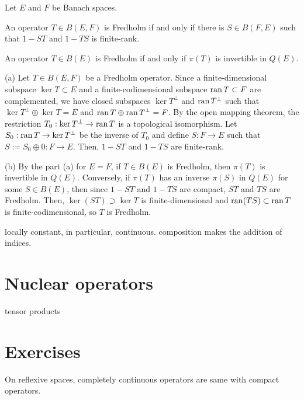 \documentclass{../../large}
\begin{document}
\begin{prb}
Let $E$ and $F$ be Banach spaces.
\begin{parts}
\item An operator $T\in B(E,F)$ is Fredholm if and only if there is $S\in B(F,E)$ such that $1-ST$ and $1-TS$ is finite-rank.
\item An operator $T\in B(E)$ is Fredholm if and only if $\pi(T)$ is invertible in $Q(E)$.
\end{parts}
\end{prb}
\begin{pf}
(a)
Let $T\in B(E,F)$ be a Fredholm operator.
Since a finite-dimensional subspace $\ker T\subset E$ and a finite-codimensional subspace $\operatorname{ran} T\subset F$ are complemented, we have closed subspaces $\ker T^\perp$ and $\operatorname{ran} T^\perp$ such that $\ker T^\perp\oplus\ker T=E$ and $\operatorname{ran} T\oplus\operatorname{ran} T^\perp=F$.
By the open mapping theorem, the restriction $T_0:\ker T^\perp\to\operatorname{ran} T$ is a topological isomorphism.
Let $S_0:\operatorname{ran} T\to\ker T^\perp$ be the inverse of $T_0$ and define $S:F\to E$ such that $S:=S_0\oplus0:F\to E$.
Then, $1-ST$ and $1-TS$ are finite-rank.

(b)
By the part (a) for $E=F$, if $T\in B(E)$ is Fredholm, then $\pi(T)$ is invertible in $Q(E)$.
Conversely, if $\pi(T)$ has an inverse $\pi(S)$ in $Q(E)$ for some $S\in B(E)$, then since $1-ST$ and $1-TS$ are compact, $ST$ and $TS$ are Fredholm.
Then, $\ker(ST)\supset\ker T$ is finite-dimensional and $\operatorname{ran}(TS)\subset\operatorname{ran} T$ is finite-codimensional, so $T$ is Fredholm.
\end{pf}

\begin{prb}
locally constant, in particular, continuous.
composition makes the addition of indices.
\end{prb}

\section{Nuclear operators}
tensor products





\section*{Exercises}

\begin{prb}
On reflexive spaces, completely continuous operators are same with compact operators.
\end{prb}
\end{document}
